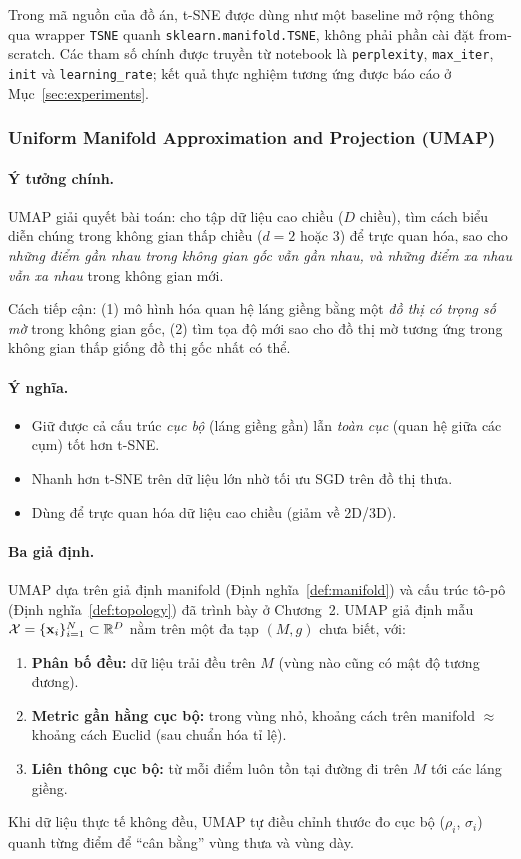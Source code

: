 Trong mã nguồn của đồ án, t-SNE được dùng như một baseline mở rộng thông qua
wrapper \texttt{TSNE} quanh \texttt{sklearn.manifold.TSNE}, không phải phần
cài đặt from-scratch. Các tham số chính được truyền từ notebook là
\texttt{perplexity}, \texttt{max\_iter}, \texttt{init} và
\texttt{learning\_rate}; kết quả thực nghiệm tương ứng được báo cáo ở
Mục~\ref{sec:experiments}.

\subsubsection{Uniform Manifold Approximation and Projection (UMAP)}
\label{sec:umap}

\paragraph{Ý tưởng chính.}
UMAP \cite{mcinnes2018umap} giải quyết bài toán: cho tập dữ liệu cao chiều ($D$ chiều), tìm cách biểu diễn chúng trong không gian thấp chiều ($d = 2$ hoặc $3$) để trực quan hóa, sao cho \emph{những điểm gần nhau trong không gian gốc vẫn gần nhau, và những điểm xa nhau vẫn xa nhau} trong không gian mới.

Cách tiếp cận: (1) mô hình hóa quan hệ láng giềng bằng một \emph{đồ thị có trọng số mờ} trong không gian gốc, (2) tìm tọa độ mới sao cho đồ thị mờ tương ứng trong không gian thấp giống đồ thị gốc nhất có thể.

\paragraph{Ý nghĩa.}
\begin{itemize}
  \item Giữ được cả cấu trúc \emph{cục bộ} (láng giềng gần) lẫn \emph{toàn cục} (quan hệ giữa các cụm) tốt hơn t-SNE.
  \item Nhanh hơn t-SNE trên dữ liệu lớn nhờ tối ưu SGD trên đồ thị thưa.
  \item Dùng để trực quan hóa dữ liệu cao chiều (giảm về 2D/3D).
\end{itemize}

\paragraph{Ba giả định.}
UMAP dựa trên giả định manifold (Định nghĩa~\ref{def:manifold}) và cấu trúc tô-pô (Định nghĩa~\ref{def:topology}) đã trình bày ở Chương~2.
UMAP giả định mẫu $\mathcal{X} = \{\mathbf{x}_i\}_{i=1}^N \subset \mathbb{R}^D$ nằm trên một đa tạp $(M,g)$ chưa biết, với:
\begin{enumerate}
  \item \textbf{Phân bố đều:} dữ liệu trải đều trên $M$ (vùng nào cũng có mật độ tương đương).
  \item \textbf{Metric gần hằng cục bộ:} trong vùng nhỏ, khoảng cách trên manifold $\approx$ khoảng cách Euclid (sau chuẩn hóa tỉ lệ).
  \item \textbf{Liên thông cục bộ:} từ mỗi điểm luôn tồn tại đường đi trên $M$ tới các láng giềng.
\end{enumerate}
Khi dữ liệu thực tế không đều, UMAP tự điều chỉnh thước đo cục bộ ($\rho_i$, $\sigma_i$) quanh từng điểm để ``cân bằng'' vùng thưa và vùng dày.

